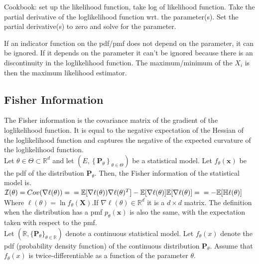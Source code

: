 Cookbook: set up the likelihood function, take log of likelihood function. Take the partial derivative of the loglikelihood function wrt. the parameter(s). Set the partial derivative(s) to zero and solve for the parameter.

If an indicator function on the pdf/pmf does not depend on the parameter, it can be ignored. If it depends on the parameter it can't be ignored because there is an discontinuity in the loglikelihood function. The maximum/minimum of the $X_i$ is then the maximum likelihood estimator.

\subsection{Fisher Information}

The Fisher information is the covariance matrix of the gradient of the loglikelihood function. It is equal to the negative expectation of the Hessian of the loglikelihood function and captures the negative of the expected curvature of the loglikelihood function.\\

Let $\theta \in \Theta \subset \mathbb {R}^ d$ and let $\left(E,\left\{ \mathbf{P}_\theta \right\} _{\theta \in \Theta }\right)$ be a statistical model. Let $f_{\theta }(\mathbf x)$ be the pdf of the distribution $\mathbf{P}_\theta$. Then, the Fisher information of the statistical model is.\\

$\mathcal{I}(\theta) = Cov(\nabla \ell(\theta)) = \\ = \mathbb{E}[\nabla \ell(\theta))\nabla\ell(\theta)^T] -  \mathbb{E}[\nabla \ell(\theta)]\mathbb{E}[\nabla \ell(\theta)] =\\ = -\mathbb{E}[\mathbb{H}\ell(\theta)]$\\

Where $\ell (\theta ) = \ln f_\theta (\mathbf X)$.If $\nabla\ell(\theta) \in \mathbb{R}^d$ it is a $d \times d$ matrix. The definition when the distribution has a pmf $p_\theta (\mathbf x)$ is also the same, with the expectation taken with respect to the pmf.\\

Let $(\mathbb {R}, \{ \mathbf{P}_\theta \} _{\theta \in \mathbb {R}})$ denote a continuous statistical model. Let $f_\theta (x)$ denote the pdf (probability density function) of the continuous distribution $\mathbf{P}_\theta$. Assume that $f_\theta (x)$ is twice-differentiable as a function of the parameter $\theta$.\\

